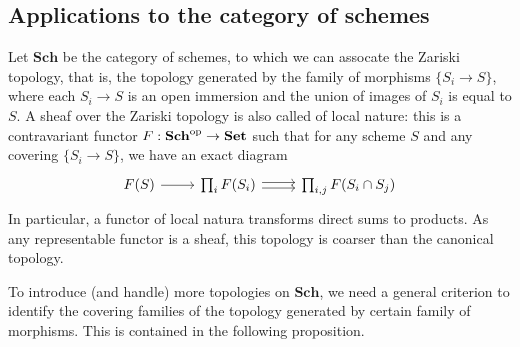 \subsection{Applications to the category of schemes}\label{site topology on Sch subsection}
Let $\mathbf{Sch}$ be the category of schemes, to which we can assocate the Zariski topology, that is, the topology generated by the family of morphisms $\{S_i\to S\}$, where each $S_i\to S$ is an open immersion and the union of images of $S_i$ is equal to $S$. A sheaf over the Zariski topology is also called of local nature: this is a contravariant functor $F:\mathbf{Sch}^{\mathrm{op}}\to\mathbf{Set}$ such that for any scheme $S$ and any covering $\{S_i\to S\}$, we have an exact diagram
\[\begin{tikzcd}
F(S)\ar[r]&\prod_iF(S_i)\ar[r,shift left=2pt]\ar[r,shift right=2pt]&\prod_{i,j}F(S_i\cap S_j)
\end{tikzcd}\]
In particular, a functor of local natura transforms direct sums to products. As any representable functor is a sheaf, this topology is coarser than the canonical topology.\par
To introduce (and handle) more topologies on $\mathbf{Sch}$, we need a general criterion to identify the covering families of the topology generated by certain family of morphisms. This is contained in the following proposition.

